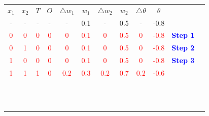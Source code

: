 \documentclass{book}
\begin{document}
\begin{center}
    \begin{tabular}{|c|c|c|c|c|c|c|c|c|c|c|c }
        \cline{1-10}
        \rowcolor{lightblue}
        \textbf{\(x_1\)} & \textbf{\(x_2\)} & \textbf{\(T\)} & \textbf{\(O\)} & \textbf{\(\triangle w_1\)} & \textbf{\(w_1\)} & \textbf{\(\triangle w_2\)} & \textbf{\(w_2\)} & \textbf{\(\triangle \theta\)} & \textbf{\(\theta\)} & \cellcolor{white}{}\\
        \cline{1-10}
        - & - & - & - & - & 0.1 & - & 0.5 & - & -0.8 & \\
        \cline{1-10}
        \textcolor{red}{0} & \textcolor{red}{0} & \textcolor{red}{0} & \textcolor{red}{0} & \textcolor{red}{0} & \textcolor{red}{0.1} & \textcolor{red}{0} & \textcolor{red}{0.5} & \textcolor{red}{0} & \textcolor{red}{-0.8} & \textcolor{blue}{\textbf{Step 1}}\\
        \cline{1-10}
        \textcolor{red}{0} & \textcolor{red}{1} & \textcolor{red}{0} & \textcolor{red}{0} & \textcolor{red}{0} & \textcolor{red}{0.1} & \textcolor{red}{0} & \textcolor{red}{0.5} & \textcolor{red}{0} & \textcolor{red}{-0.8} & \textcolor{blue}{\textbf{Step 2}} \\
        \cline{1-10}
        \textcolor{red}{1} & \textcolor{red}{0} & \textcolor{red}{0} & \textcolor{red}{0} & \textcolor{red}{0} & \textcolor{red}{0.1} & \textcolor{red}{0} & \textcolor{red}{0.5} & \textcolor{red}{0} & \textcolor{red}{-0.8} & \textcolor{blue}{\textbf{Step 3}} \\
        \cline{1-10}
        \rowcolor{lightyellow}
        \textcolor{red}{1} & \textcolor{red}{1} & \textcolor{red}{1} & \textcolor{red}{0} & \textcolor{red}{0.2} & \textcolor{red}{0.3} & \textcolor{red}{0.2} & \textcolor{red}{0.7} & \textcolor{red}{0.2} & \textcolor{red}{-0.6} & \cellcolor{white}{\textcolor{blue}{\textbf{Step 4}}}\\
        \cline{1-10}
        & & & & & & & & & & \\
        \cline{1-10}
        & & & & & & & & & & \\
        \cline{1-10}
        & & & & & & & & & & \\
        \cline{1-10}
        & & & & & & & & & & \\
        \cline{1-10}
        & & & & & & & & & & \\
        \cline{1-10}
        & & & & & & & & & & \\
        \cline{1-10}
        & & & & & & & & & & \\
        \cline{1-10}
        & & & & & & & & & & \\
        \cline{1-10}
        & & & & & & & & & & \\
        \cline{1-10}
        & & & & & & & & & & \\
        \cline{1-10}
        & & & & & & & & & & \\
        \cline{1-10}
        & & & & & & & & & & \\
        \cline{1-10}
    \end{tabular}
\end{center}
\end{document}
